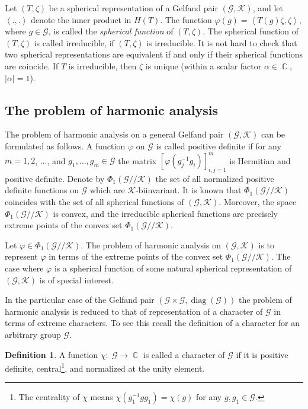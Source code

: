 \documentclass[12pt]{amsart}
\theoremstyle{definition}
\newtheorem{defn}[thm]{Definition}
\numberwithin{equation}{section}
\DeclareMathOperator{\C}{\mathbb{C}}
\DeclareMathOperator{\diag}{diag}
\begin{document}
Let  $(T,\zeta)$ be a spherical representation of a Gelfand pair $\left(\mathcal{G}, \mathcal{K}\right)$, and let $\left<.,.\right>$ denote the inner product in $H(T)$.
The function $\varphi(g)=\left<T(g)\zeta,\zeta\right>$, where $g\in \mathcal{G}$, is called the \textit{spherical function} of $\left(T,\zeta\right)$.
The  spherical function of $\left(T,\zeta\right)$ is called irreducible,
if  $\left(T,\zeta\right)$ is irreducible.
It is not hard to check that two spherical representations are equivalent if and only if their spherical functions are coincide.
If $T$ is irreducible, then $\zeta$ is unique (within a scalar factor $\alpha\in\C$, $|\alpha|=1$).
\subsection{The problem of harmonic analysis}\label{SectionPHAGENERAL}
The problem of harmonic analysis on a general Gelfand pair $\left(\mathcal{G},\mathcal{K}\right)$ can be formulated as follows. A function $\varphi$ on $\mathcal{G}$ is called positive definite if for any $m=1,2$, $\ldots$, and $g_1,\ldots, g_m\in \mathcal{G}$ the matrix
$\left[\varphi\left(g_j^{-1}g_i\right)\right]_{i,j=1}^m$ is Hermitian and positive definite.
Denote by $\Phi_1\left(\mathcal{G}//\mathcal{K}\right)$ the set of all normalized positive definite functions on $\mathcal{G}$ which are $\mathcal{K}$-biinvariant. It is known that $\Phi_1\left(\mathcal{G}//\mathcal{K}\right)$ coincides with the set of all spherical functions of
$\left(\mathcal{G},\mathcal{K}\right)$. Moreover, the space $\Phi_1\left(\mathcal{G}//\mathcal{K}\right)$ is convex, and the irreducible spherical functions are precisely extreme points of the convex set $\Phi_1\left(\mathcal{G}//\mathcal{K}\right)$.

Let  $\varphi\in\Phi_1\left(\mathcal{G}//\mathcal{K}\right)$. The problem
of harmonic analysis on $\left(\mathcal{G},\mathcal{K}\right)$ is to represent  $\varphi$ in terms of the extreme points of the convex set $\Phi_1\left(\mathcal{G}//\mathcal{K}\right)$.
The case where $\varphi$ is a spherical function of some natural  spherical representation
of $\left(\mathcal{G},\mathcal{K}\right)$ is of special interest.

In the particular case of the Gelfand pair $\left(\mathcal{G}\times \mathcal{G},\diag\left(\mathcal{G}\right)\right)$ the problem of harmonic analysis
is reduced to that of representation of a character of $\mathcal{G}$ in terms of extreme characters. To see this recall the definition of a character for an arbitrary group $\mathcal{G}$.
\begin{defn}\label{characters7}
A function $\chi:\; \mathcal{G}\rightarrow\C$ is called a character of $\mathcal{G}$ if it is positive definite, central\footnote{The centrality of $\chi$ means $\chi(g_1^{-1}gg_1)=\chi(g)$ for any $g, g_1 \in \mathcal{G}$.},  and normalized at the unity element.
\end{defn}
\end{document}
